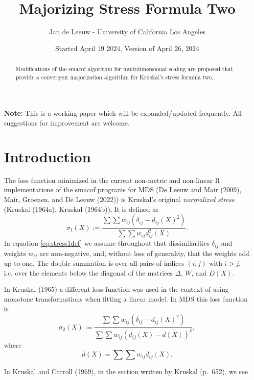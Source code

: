 \documentclass[
  12pt,
]{article}
\title{Majorizing Stress Formula Two}
\author{Jan de Leeuw - University of California Los Angeles}
\date{Started April 19 2024, Version of April 26, 2024}
\theoremstyle{definition}
\theoremstyle{definition}
\theoremstyle{definition}
\theoremstyle{definition}
\theoremstyle{remark}
\begin{document}
\maketitle
\begin{abstract}
Modifications of the smacof algorithm for multidimensional scaling are proposed that provide a convergent majorization algorithm for Kruskal's stress formula two.
\end{abstract}

{
\setcounter{tocdepth}{3}
\tableofcontents
}
\textbf{Note:} This is a working paper which will be expanded/updated frequently. All suggestions for improvement are welcome.

\section{Introduction}\label{introduction}

The loss function minimized in the current non-metric and non-linear R implementations of the smacof programs for MDS
(De Leeuw and Mair (2009), Mair, Groenen, and De Leeuw (2022)) is Kruskal's original \emph{normalized stress} (Kruskal (1964a), Kruskal (1964b)). It is defined as
\begin{equation}
\sigma_1(X):=\frac{\sum\sum w_{ij}(\delta_{ij}- d_{ij}(X)^2)}{\sum\sum w_{ij}d_{ij}^2(X)}.
\label{eq:stress1def}
\end{equation}
In equation \eqref{eq:stress1def} we assume throughout that dissimilarities \(\delta_{ij}\)
and weights \(w_{ij}\) are non-negative, and, without loss of generality, that the weights add up to one. The double summation is over all pairs of indices \((i,j)\) with \(i>j\), i.e, over the
elements below the diagonal of the matrices \(\Delta\), \(W\), and \(D(X)\).

In Kruskal (1965) a different loss function was used in the context of using monotone transformations when fitting a linear model. In MDS this loss function is
\begin{equation}
\sigma_2(X):=\frac{\sum\sum w_{ij}(\delta_{ij}- d_{ij}(X)^2)}{\sum\sum w_{ij}(d_{ij}(X)-\overline{d}(X))^2},
\label{eq:stress2def}
\end{equation}
where
\begin{equation}
\overline{d}(X)=\sum\sum w_{ij}d_{ij}(X).
\label{eq:doverdef}
\end{equation}

In Kruskal and Carroll (1969), in the section written by Kruskal (p.~652), we see
\end{document}
